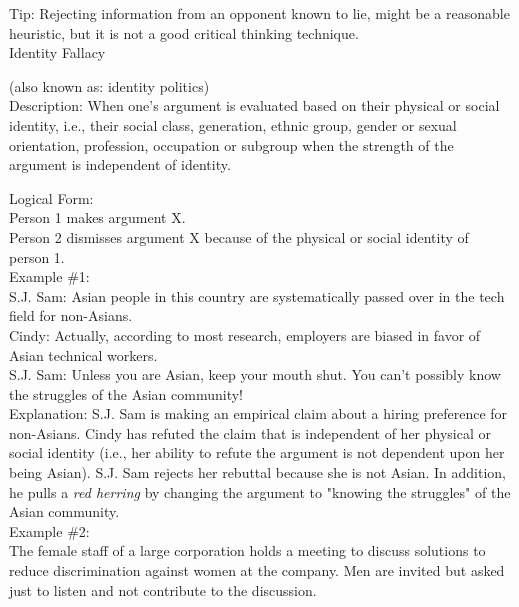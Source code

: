 \documentclass[a4paper,12pt,single,pdftex]{scrartcl}
\begin{document}
    
      Tip: Rejecting information from an opponent known to lie, might be a reasonable heuristic, but it is not a good critical thinking technique.
    \\

  

Identity Fallacy
    
      (also known as: identity politics)
    \\

  
    Description: When one's argument is evaluated based on their physical or social identity, i.e., their social class, generation, ethnic group, gender or sexual orientation, profession, occupation or subgroup when the strength of the argument is independent of identity.

    
      Logical Form:
    \\

    
      Person 1 makes argument X.
    \\

    
      Person 2 dismisses argument X because of the physical or social identity of person 1.
    \\

    
      Example \#1:
    \\

    
      S.J. Sam: Asian people in this country are systematically passed over in the tech field for non-Asians.
    \\

    
      Cindy: Actually, according to most research, employers are biased in favor of Asian technical workers.
    \\

    
      S.J. Sam: Unless you are Asian, keep your mouth shut. You can't possibly know the struggles of the Asian community!
    \\

    
      Explanation: S.J. Sam is making an empirical claim about a hiring preference for non-Asians. Cindy has refuted the claim that is independent of her physical or social identity (i.e., her ability to refute the argument is not dependent upon her being Asian). S.J. Sam rejects her rebuttal because she is not Asian. In addition, he pulls a {\it red herring} by changing the argument to "knowing the struggles" of the Asian community.
    \\

    
      Example \#2:
    \\

    
      The female staff of a large corporation holds a meeting to discuss solutions to reduce discrimination against women at the company. Men are invited but asked just to listen and not contribute to the discussion.
    \\
\end{document}
